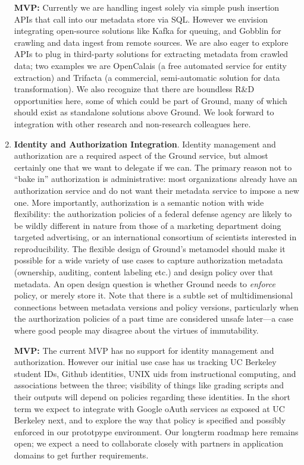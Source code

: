 \begin{enumerate}
\textbf{MVP:}  Currently we are handling ingest solely via simple push insertion APIs that call into our metadata store via SQL.  However we envision integrating open-source solutions like Kafka for queuing, and Gobblin for crawling and data ingest from remote sources.  We are also eager to explore APIs to plug in third-party solutions for  extracting metadata from crawled data; two examples we are OpenCalais (a free automated service for entity extraction) and Trifacta (a commercial, semi-automatic solution for data transformation).  We also recognize that there are boundless R\&D opportunities here, some of which could be part of Ground, many of which should exist as standalone solutions above Ground.    We look forward to integration with other research and non-research colleagues here.

\item \textbf{Identity and Authorization Integration}.  Identity management and authorization are a required aspect of the Ground service, but almost certainly one that we want to delegate if we can.  The primary reason not to ``bake in'' authorization is administrative: most organizations already have an authorization service and do not want their metadata service to impose a new one.  More importantly, authorization is a semantic notion with wide flexibility: the authorization policies of a federal defense agency are likely to be wildly different in nature from those of a marketing department doing targeted advertising, or an international consortium of scientists interested in reproducibility.  The flexible design of Ground's metamodel should make it possible for a wide variety of use cases to capture authorization metadata (ownership, auditing, content labeling etc.) and design policy over that metadata.  An open design question is whether Ground needs to \emph{enforce} policy, or merely store it.  Note that there is a subtle set of multidimensional connections between metadata versions and policy versions, particularly when the aurthorization policies of a past time are considered unsafe later---a case where good people may disagree about the virtues of immutability.

\textbf{MVP:}  The current MVP has no support for identity management and authorization.  However our initial use case has us tracking UC Berkeley student IDs, Github identities, UNIX uids from instructional computing, and associations between the three; visibility of things like grading scripts and their outputs will depend on policies regarding these identities.  In the short term we expect to integrate with Google oAuth services as exposed at UC Berkeley next, and to explore the way that policy is specified and possibly enforced in our prototpype environment.  Our longterm roadmap here remains open; we expect a need to collaborate closely with partners in application domains to get further requirements.  


\end{enumerate}
